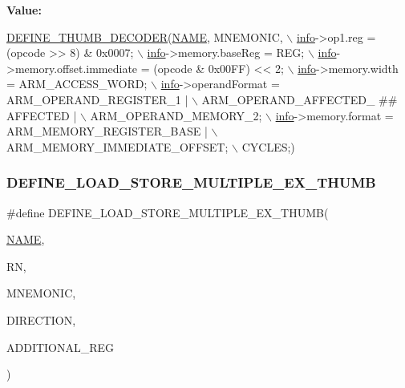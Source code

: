 {\bfseries Value\+:}
\begin{DoxyCode}
\mbox{\hyperlink{decoder-thumb_8c_a44d34ec3fd7c2c2ee51ff5966678c86e}{DEFINE\_THUMB\_DECODER}}(\mbox{\hyperlink{inflate_8h_a164ea0159d5f0b5f12a646f25f99eceaa67bc2ced260a8e43805d2480a785d312}{NAME}}, MNEMONIC, \(\backslash\)
        \mbox{\hyperlink{libretro_8h_structretro__game__info}{info}}->op1.reg = (opcode >> 8) & 0x0007; \(\backslash\)
        \mbox{\hyperlink{libretro_8h_structretro__game__info}{info}}->memory.baseReg = REG; \(\backslash\)
        \mbox{\hyperlink{libretro_8h_structretro__game__info}{info}}->memory.offset.immediate = (opcode & 0x00FF) << 2; \(\backslash\)
        \mbox{\hyperlink{libretro_8h_structretro__game__info}{info}}->memory.width = ARM\_ACCESS\_WORD; \(\backslash\)
        \mbox{\hyperlink{libretro_8h_structretro__game__info}{info}}->operandFormat = ARM\_OPERAND\_REGISTER\_1 | \(\backslash\)
            ARM\_OPERAND\_AFFECTED\_ ## AFFECTED | \(\backslash\)
            ARM\_OPERAND\_MEMORY\_2; \(\backslash\)
        \mbox{\hyperlink{libretro_8h_structretro__game__info}{info}}->memory.format = ARM\_MEMORY\_REGISTER\_BASE | \(\backslash\)
            ARM\_MEMORY\_IMMEDIATE\_OFFSET; \(\backslash\)
        CYCLES;)
\end{DoxyCode}
\mbox{\label{decoder-thumb_8c_aaa81a7373807ab43c5b56789bf6628ea}} 
\subsubsection{\texorpdfstring{D\+E\+F\+I\+N\+E\+\_\+\+L\+O\+A\+D\+\_\+\+S\+T\+O\+R\+E\+\_\+\+M\+U\+L\+T\+I\+P\+L\+E\+\_\+\+E\+X\+\_\+\+T\+H\+U\+MB}{DEFINE\_LOAD\_STORE\_MULTIPLE\_EX\_THUMB}}
{\footnotesize\ttfamily \#define D\+E\+F\+I\+N\+E\+\_\+\+L\+O\+A\+D\+\_\+\+S\+T\+O\+R\+E\+\_\+\+M\+U\+L\+T\+I\+P\+L\+E\+\_\+\+E\+X\+\_\+\+T\+H\+U\+MB(\begin{DoxyParamCaption}\item[{}]{\mbox{\hyperlink{inflate_8h_a164ea0159d5f0b5f12a646f25f99eceaa67bc2ced260a8e43805d2480a785d312}{N\+A\+ME}},  }\item[{}]{RN,  }\item[{}]{M\+N\+E\+M\+O\+N\+IC,  }\item[{}]{D\+I\+R\+E\+C\+T\+I\+ON,  }\item[{}]{A\+D\+D\+I\+T\+I\+O\+N\+A\+L\+\_\+\+R\+EG }\end{DoxyParamCaption})}

